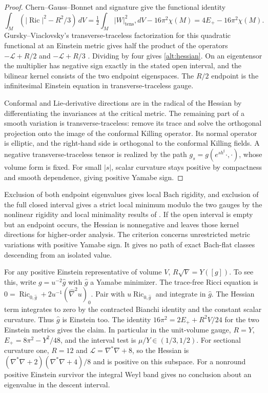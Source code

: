 \begin{proof}
Chern--Gauss--Bonnet and signature give the functional identity
\[
 \int_M(|\operatorname{Ric}|^2-R^2/3)\,dV
 =\tfrac12\int_M |W|_{\mathrm{tens}}^2,dV-16\pi^2\chi(M)
 =4E_+-16\pi^2\chi(M).
\]
Gursky--Viaclovsky's transverse-traceless factorization for this
quadratic functional at an Einstein metric gives half the product
of the operators \(-\mathcal L+R/2\) and \(-\mathcal L+R/3\)
\cite[Theorem 3.10 and equation (3.41)]{GurskyViaclovsky2015}.
Dividing by four gives \eqref{alt:hessian}. On an eigentensor
the multiplier has negative sign exactly in the stated open
interval, and the bilinear kernel consists of the two endpoint
eigenspaces. The \(R/2\) endpoint is the infinitesimal Einstein
equation in transverse-traceless gauge.

Conformal and Lie-derivative directions are in the radical
of the Hessian by differentiating the invariances at the
critical metric. The remaining part of a smooth variation is
transverse-traceless: remove its trace and solve the orthogonal
projection onto the image of the conformal Killing operator.
Its normal operator is elliptic, and the right-hand side is
orthogonal to the conformal Killing fields. A negative
transverse-traceless tensor is realized by the path
\(g_s=g(e^{s h^\sharp}\cdot,\cdot)\), whose volume form is fixed.
For small \(|s|\), scalar curvature stays positive by compactness
and smooth dependence, giving positive Yamabe sign.
\end{proof}

Exclusion of both endpoint eigenvalues gives local Bach
rigidity, and exclusion of the full closed interval gives a
strict local minimum modulo the two gauges by the nonlinear
rigidity and local minimality results of
\cite[Theorem 1.6 and Proposition 6.4]{GurskyViaclovsky2015}.
If the open interval is empty but an endpoint occurs, the
Hessian is nonnegative and leaves those kernel directions
for higher-order analysis. The criterion concerns unrestricted
metric variations with positive Yamabe sign. It gives no path
of exact Bach-flat classes descending from an isolated value.

For any positive Einstein representative of volume \(V\),
\(R\sqrt V=Y([g])\). To see this, write
\(g=u^{-2}\widehat g\) with \(\widehat g\) a Yamabe minimizer.
The trace-free Ricci equation is
\(0=\operatorname{Ric}_{0,\widehat g}
      +2u^{-1}(\widehat\nabla^2u)_0\).
Pair with \(u\operatorname{Ric}_{0,\widehat g}\) and integrate
in \(\widehat g\). The Hessian term integrates to zero by the
contracted Bianchi identity and the constant scalar curvature.
Thus \(\widehat g\) is Einstein too. The identity
\(16\pi^2=2E_++R^2 V/24\) for the two Einstein metrics
gives the claim. In particular in the unit-volume gauge,
\(R=Y\), \(E_+=8\pi^2-Y^2/48\), and the interval test is
\(\mu/Y\in(1/3,1/2)\). For sectional curvature one,
\(R=12\) and \(\mathcal L=\nabla^*\nabla+8\), so the Hessian
is \((\nabla^*\nabla+2)(\nabla^*\nabla+4)/8\) and is
positive on this subspace. For a nonround positive Einstein
survivor the integral Weyl band gives no conclusion about an
eigenvalue in the descent interval.
